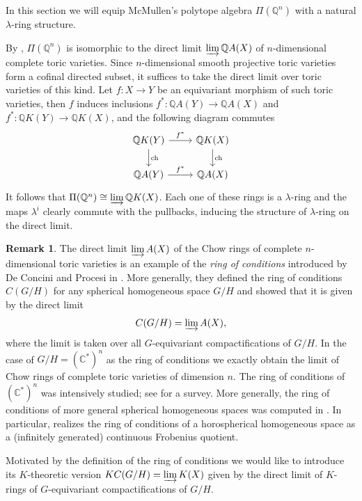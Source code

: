 \documentclass[oneside]{amsart}
\theoremstyle{plain}
\theoremstyle{definition}
\newtheorem{remark}[theorem]{Remark}
\newcommand{\C}{{\mathbb{C}}}
\newcommand{\Q}{{\mathbb{Q}}}
\newcommand{\ch}{{\mathrm{ch}}}
\begin{document}
In this section we will equip McMullen's polytope algebra $\Pi(\Q^n)$ with a natural $\lambda$-ring structure.

By \cite[Theorem 5.2]{FS97}, $\Pi(\Q^n)$ is isomorphic to the direct limit
$\varinjlim \Q A(X)$ of $n$-dimensional complete toric varieties. Since $n$-dimensional smooth projective
toric varieties form a cofinal directed subset, it suffices to take the direct limit over toric varieties of this kind. Let $f: X \to Y$ be an equivariant morphism of such toric varieties, then $f$ induces inclusions
$f^*: \Q A(Y) \to \Q A(X)$ and $f^*: \Q K(Y) \to \Q K(X)$, and the following diagram commutes
\[
\begin{tikzcd}
\Q K(Y) \arrow[d, "\ch"] \arrow[r, "f^*"] & \Q K(X) \arrow[d, "\ch"] \\
\Q A(Y) \arrow[r, "f^*"]          & \Q A(X)         
\end{tikzcd}
\]
It follows that $\Pi(\Q^n) \cong \varinjlim \Q K(X)$. Each one of these rings is a $\lambda$-ring and the maps
$\lambda^i$ clearly commute with the pullbacks, inducing the structure of $\lambda$-ring on the direct limit.


\begin{remark}\label{rem:ring-conditions}
The direct limit $\varinjlim A(X)$ of the Chow rings of complete $n$-dimensional toric varieties is an example of the \emph{ring of conditions} introduced by De Concini and Procesi in  \cite{de1985complete}. More generally, they defined the ring of conditions $C(G/H)$ for any spherical homogeneous space $G/H$ and showed that it is given by the direct limit 
\[
C(G/H) = \varinjlim A(X),
\]
where the limit is taken over all $G$-equivariant compactifications of $G/H$.
In the case of $G/H= (\C^*)^n$ as the ring of conditions we exactly obtain the limit of Chow rings of complete toric varieties of dimension $n$. The ring of conditions of $(\C^*)^n$ was intensively studied; see \cite[Section 7]{kazarnovskii2021newton} for a survey. More generally, the ring of conditions of more general spherical homogeneous spaces was computed in \cite{strickland2008ring, strickland2011equivariant, esterov2017characteristic, gibson2018rings, khovanskii2021gorenstein}.
In particular, \cite{khovanskii2021gorenstein} realizes the ring of conditions of a horospherical homogeneous space as a (infinitely generated) continuous Frobenius quotient.

Motivated by the definition of the ring of conditions we would like to introduce its $K$-theoretic version $KC(G/H)=\varinjlim K(X)$ given by the direct limit of $K$-rings of $G$-equivariant compactifications of $G/H$. 
\end{remark}
\end{document}
